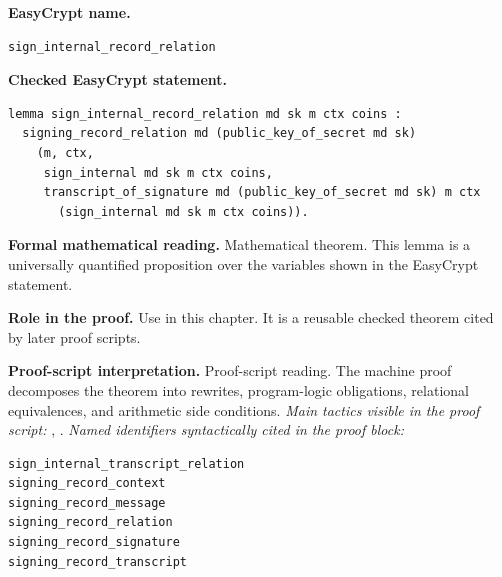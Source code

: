 \begin{formaltheorem}
\noindent\textbf{EasyCrypt name.}
\begin{lstlisting}[language=EasyCrypt,basicstyle=\ttfamily\scriptsize]
sign_internal_record_relation
\end{lstlisting}
\noindent\textbf{Checked EasyCrypt statement.}
\begin{lstlisting}[language=EasyCrypt,basicstyle=\ttfamily\scriptsize]
lemma sign_internal_record_relation md sk m ctx coins :
  signing_record_relation md (public_key_of_secret md sk)
    (m, ctx,
     sign_internal md sk m ctx coins,
     transcript_of_signature md (public_key_of_secret md sk) m ctx
       (sign_internal md sk m ctx coins)).
\end{lstlisting}
\noindent\textbf{Formal mathematical reading.}
Mathematical theorem. This lemma is a universally quantified proposition over the variables shown in the EasyCrypt statement.

\noindent\textbf{Role in the proof.}
Use in this chapter. It is a reusable checked theorem cited by later proof scripts.

\noindent\textbf{Proof-script interpretation.}
Proof-script reading. The machine proof decomposes the theorem into rewrites, program-logic obligations, relational equivalences, and arithmetic side conditions.
\emph{Main tactics visible in the proof script:} , .
\emph{Named identifiers syntactically cited in the proof block:}
\begin{lstlisting}[language=EasyCrypt,basicstyle=\ttfamily\scriptsize]
sign_internal_transcript_relation
signing_record_context
signing_record_message
signing_record_relation
signing_record_signature
signing_record_transcript
\end{lstlisting}

\end{formaltheorem}

